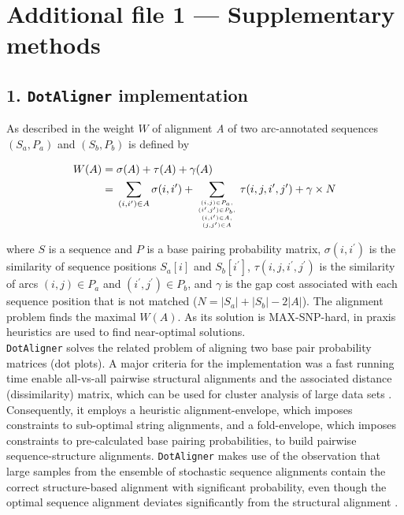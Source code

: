 \documentclass{bmcart}
\newcommand\dotaligner{\texttt{DotAligner}}
\begin{document}
\section*{Additional file 1 --- Supplementary methods}

\subsection*{ 1. \dotaligner{} implementation }
\noindent As described in \cite{Palu2010} the weight $W$ of alignment \emph{A}
of two arc-annotated sequences $(S_a,P_a)$ and $(S_b,P_b)$ is defined by

\begin{equation}\label{eq1}
\begin{aligned}
	W(A) ={} & \sigma(A) + \tau(A) + \gamma(A) \\
	     ={} & \sum_{(i,i^\prime) \in A} \sigma(i,i^\prime) + \sum_{(i,j) \in
	P_a,\atop {(i^\prime,j^\prime) \in P_b,\atop {(i,i^\prime) \in
	A,\atop (j,j^\prime) \in A}}} \tau(i,j,i^\prime,j^\prime) + \gamma
	\times N
\end{aligned}
\end{equation}

\noindent where $S$ is a sequence and $P$ is a base pairing probability matrix,
$\sigma(i,i^\prime)$ is the similarity of sequence positions $S_a[i]$ and
$S_b[i^\prime]$, $\tau(i,j,i^\prime,j^\prime)$ is the similarity of arcs $(i,j)
\in P_a$ and $(i^\prime,j^\prime) \in P_b$,
and $\gamma$ is the gap cost associated with each sequence position that is not
matched ($N = |S_a|+|S_b|-2|A|$). The alignment problem finds the maximal
$W(A)$. As its solution is MAX-SNP-hard, in praxis heuristics are used to find
near-optimal solutions.\\

\dotaligner{} solves the related problem of aligning two base pair
probability matrices (dot plots). A major criteria for the implementation was a fast
running time enable all-vs-all pairwise structural alignments and the 
associated distance (dissimilarity) matrix, which can be used for 
cluster analysis of large data sets \cite{Will17432929}. Consequently, 
it employs a heuristic alignment-envelope, 
which imposes constraints to sub-optimal string alignments, 
and a fold-envelope, which imposes constraints to pre-calculated base pairing probabilities, 
to build pairwise sequence-structure alignments. 
\dotaligner{} makes use of the observation that large samples from the ensemble 
of stochastic sequence alignments contain the correct structure-based alignment
with significant probability,  even though the optimal
sequence alignment deviates significantly from the structural alignment
\cite{Muckstein12385998}. \\
\end{document}
